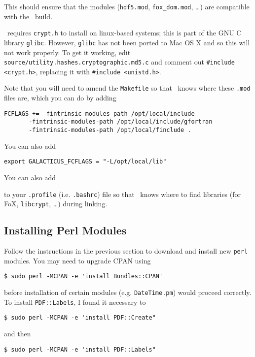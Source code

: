 This should ensure that the modules ({\tt hdf5.mod}, {\tt fox\_dom.mod}, \ldots) are compatible with the \glc\ build.

\glc\ requires {\tt crypt.h} to install on linux-based systems; this is part of the GNU C library {\tt glibc}. However, {\tt glibc} has not been ported to Mac OS X and so this will not work properly. To get it working, edit {\tt source/utility.hashes.cryptographic.md5.c} and comment out {\tt \#include \textless crypt.h\textgreater}, replacing it with {\tt \#include \textless unistd.h\textgreater}.

Note that you will need to amend the {\tt Makefile} so that \glc\ knows where these {\tt .mod} files are, which you can do by adding

\begin{verbatim}
FCFLAGS += -fintrinsic-modules-path /opt/local/include 
	   -fintrinsic-modules-path /opt/local/include/gfortran
	   -fintrinsic-modules-path /opt/local/finclude .
\end{verbatim}

You can also add

\begin{verbatim}
export GALACTICUS_FCFLAGS = "-L/opt/local/lib"
\end{verbatim}

You can also add

to your {\tt .profile} (i.e. {\tt .bashrc}) file so that \glc\ knows where to find libraries (for FoX, {\tt libcrypt}, \ldots) during linking.

\subsection{Installing Perl Modules}

Follow the instructions in the previous section to download and install new {\tt perl} modules. You may need to upgrade CPAN using

\begin{verbatim}
$ sudo perl -MCPAN -e 'install Bundles::CPAN'
\end{verbatim}

before installation of certain modules (e.g. {\tt DateTime.pm}) would proceed correctly. To install {\tt PDF::Labels}, I found it necessary to

\begin{verbatim}
$ sudo perl -MCPAN -e 'install PDF::Create"
\end{verbatim}

and then

\begin{verbatim}
$ sudo perl -MCPAN -e 'install PDF::Labels"
\end{verbatim}

